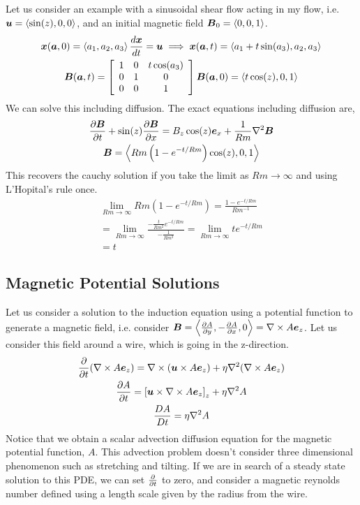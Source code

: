 \documentclass{article}
\begin{document}
\subsection{}
Let us consider an example with a sinusoidal shear flow acting in my flow, i.e.
$\boldsymbol{u} = \left<\sin(z), 0, 0\right>$, and an initial magnetic field $\boldsymbol{B}_0 =
\left<0, 0, 1\right>$. 
\begin{gather*}
    \boldsymbol{x}(\boldsymbol{a},0) = \left<a_1, a_2, a_3\right>
    \frac{d \boldsymbol{x}}{d t} = \boldsymbol{u} \implies \boldsymbol{x}(\boldsymbol{a},t) = \left<a_1 + t\sin(a_3), a_2,
    a_3\right>\\
    \boldsymbol{B}(\boldsymbol{a},t) = \left[\begin{array}{c c c}
        1 & 0 & t\cos(a_3)\\
        0 & 1 & 0\\
        0 & 0 & 1
        \end{array}\right]\boldsymbol{B}(\boldsymbol{a},0) = \left<t\cos(z), 0, 1\right>
\end{gather*}
We can solve this including diffusion. The exact equations including diffusion
are, 
\begin{gather*}
    \frac{\partial \boldsymbol{B}}{\partial t} + \sin(z)\frac{\partial \boldsymbol{B}}{\partial x} = B_z\cos(z)\boldsymbol{e}_x + \frac{1}{Rm}\nabla^2\boldsymbol{B}\\
    \boldsymbol{B} = \left<Rm\left( 1 - e^{-t/Rm}\right)\cos(z), 0, 1\right>
\end{gather*}
This recovers the cauchy solution if you take the limit as $Rm \to \infty$ and
using L'Hopital's rule once. 
\begin{gather*}
    \lim_{Rm \to \infty} Rm\left(1 - e^{-t/Rm}\right) = \frac{1 -
    e^{-t/Rm}}{Rm^{-1}}\\
     = \lim_{Rm \to \infty} \frac{-\frac{t}{Rm^2}e^{-t/Rm}}{-\frac{1}{Rm^2}} =
     \lim_{Rm \to \infty} te^{-t/Rm}\\
     = t
\end{gather*}

\subsection{Magnetic Potential Solutions}

Let us consider a solution to the induction equation using a potential function
to generate a magnetic field, i.e. consider $\boldsymbol{B} = \left< \frac{\partial A}{\partial y},
-\frac{\partial A}{\partial x}, 0\right> = \nabla\times A\boldsymbol{e}_z$. Let us consider this field around a
wire, which is going in the z-direction. 
\begin{gather*}
    \frac{\partial }{\partial t}(\nabla\times A\boldsymbol{e}_z) = \nabla\times(\boldsymbol{u}\times A\boldsymbol{e}_z) + \eta\nabla^2
    (\nabla\times A\boldsymbol{e}_z)\\
    \frac{\partial A}{\partial t} = \left[\boldsymbol{u}\times\nabla\times A\boldsymbol{e}_z\right]_z + \eta \nabla^2 A\\
    \frac{D A}{D t} = \eta\nabla^2A
\end{gather*}
Notice that we obtain a scalar advection diffusion equation for the magnetic
potential function, $A$. This advection problem doesn't consider three
dimensional phenomenon such as stretching and tilting. If we are in search of a
steady state solution to this PDE, we can set $\frac{\partial }{\partial t}$ to zero, and consider a
magnetic reynolds number defined using a length scale given by the radius from
the wire. 
\end{document}
